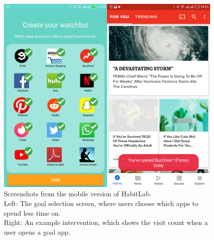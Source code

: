 \begin{figure}
\includegraphics[width=\linewidth]{figures2/android_combined}
\caption{Screenshots from the mobile version of HabitLab.\\
Left: The goal selection screen, where users choose which apps to spend less time on.\\
Right: An example intervention, which shows the visit count when a user opens a goal app. %
}
  \label{fig:android-goal-selection}
\end{figure}


